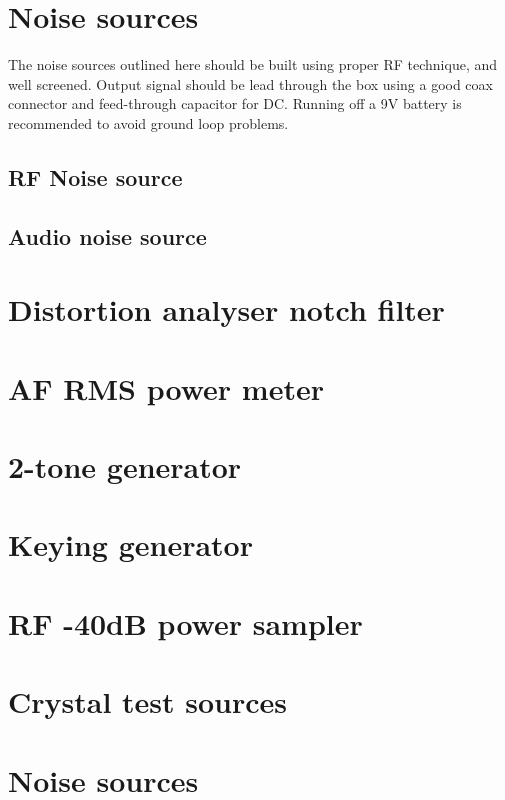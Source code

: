 \documentclass[10pt,letterpaper]{book}
\begin{document}
\section{Noise sources}
The noise sources outlined here should be built using proper RF technique, and well screened. Output signal should be lead through the box using a good coax connector and feed-through capacitor for DC. Running off a 9V battery is recommended to avoid ground loop problems. 
\subsection*{RF Noise source}
\subsection*{Audio noise source}
\section{Distortion analyser notch filter}
\section{AF RMS power meter}
\section{2-tone generator}
\section{Keying generator}
\section{RF -40dB power sampler}
\section{Crystal test sources}
\section{Noise sources}
\end{document}
